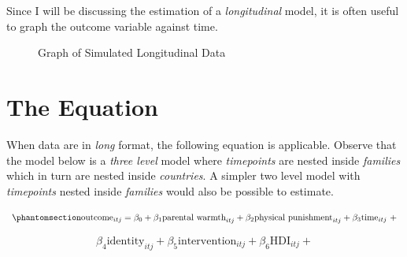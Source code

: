 \documentclass[
  letterpaper,
  DIV=11,
  numbers=noendperiod]{scrreprt}
\begin{document}
Since I will be discussing the estimation of a \emph{longitudinal}
model, it is often useful to graph the outcome variable against time.

\begin{figure}


\caption{\label{fig-data2}Graph of Simulated Longitudinal Data}

\end{figure}%

\section{The Equation}\label{the-equation-1}

When data are in \emph{long} format, the following equation is
applicable. Observe that the model below is a \emph{three level} model
where \emph{timepoints} are nested inside \emph{families} which in turn
are nested inside \emph{countries}. A simpler two level model with
\emph{timepoints} nested inside \emph{families} would also be possible
to estimate.

\begin{equation}\phantomsection\label{eq-MLM-longitudinal}{\text{outcome}_{itj} = \beta_0 + \beta_1 \text{parental warmth}_{itj} + \beta_2 \text{physical punishment}_{itj} + \beta_3 \text{time}_{itj} \ + }\end{equation}

\[\beta_4 \text{identity}_{itj} + \beta_5 \text{intervention}_{itj} + \beta_6 \text{HDI}_{itj} +\]
\end{document}
